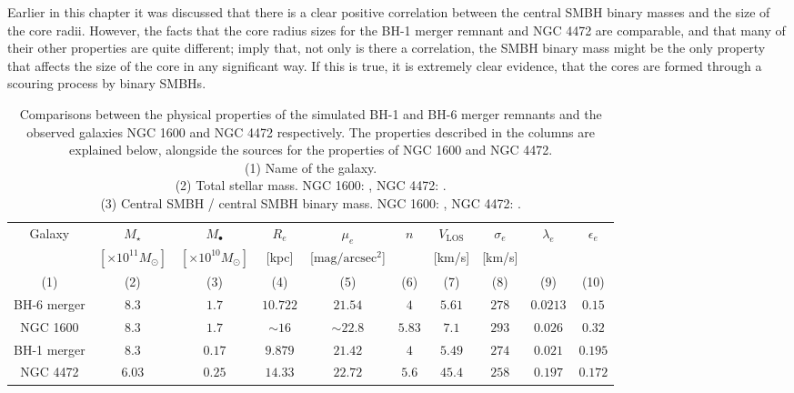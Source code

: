 \documentclass[english, oneside]{HYgradu}
\begin{document}
Earlier in this chapter it was discussed that there is a clear positive correlation between the central SMBH binary masses and the size of the core radii. However, the facts that the core radius sizes for the BH-1 merger remnant and NGC 4472 are comparable, and that many of their other properties are quite different; imply that, not only is there a correlation, the SMBH binary mass might be the only property that affects the size of the core in any significant way. If this is true, it is extremely clear evidence, that the cores are formed through a scouring process by binary SMBHs.


\begin{table}
	\begin{center}
		\scriptsize
		\begin{tabular}{c c c c c c c c c c}
		\hline
		\hline
		Galaxy & $M_\star$ & $M_\bullet$ & $R_e$ & $\mu_e$ & $n$ & 
		$V_\mathrm{LOS}$ & $\sigma_e$ & $\lambda_e$ &
		$\epsilon_e$ \\
		& $[\times 10^{11} M_\odot]$ & $[\times 10^{10} M_\odot]$ &
		[kpc] & [$\mathrm{mag/arcsec^2}$] & & [km/s] & [km/s] & & \\
		(1) & (2) & (3) & (4) & (5) & (6) & (7) & (8) & (9) & (10) \\
		\hline
		BH-6 merger & $8.3$ & $1.7$ & $10.722$ & $21.54$ & $4$ & $5.61$ & $278$ & $0.0213$ & $0.15$ \\
		NGC 1600 & $8.3$ & $1.7$ & $\sim 16$ & $\sim 22.8$ & $5.83$ & $7.1$ & $293$ & $0.026$ & $0.32$ \\
		\hdashline
		BH-1 merger & $8.3$ & $0.17$ & $9.879$ & $21.42$ & $4$ & $5.49$ & $274$ & $0.021$ & $0.195$ \\
		NGC 4472 & $6.03$ & $0.25$ & $14.33$ & $22.72$ & $5.6$ & $45.4$ & 
		$258$ & $0.197$ & $0.172$ \\
		\hline
		\end{tabular}
	\end{center}
	\caption{Comparisons between the physical properties of the simulated BH-1 and BH-6 merger remnants and the observed galaxies NGC 1600 and NGC 4472 respectively. The properties described in the columns are explained below, alongside the sources for the properties of NGC 1600 and NGC 4472. \\
	(1) Name of the galaxy. \\
	(2) Total stellar mass. NGC 1600: \cite{Thomas2016}, NGC 4472: \cite{Veale2018lambda}. \\
	(3) Central SMBH / central SMBH binary mass. NGC 1600:  \cite{Thomas2016}, NGC 4472: \cite{Rusli2013_BHmass}. \\
}
\end{table}
\end{document}
